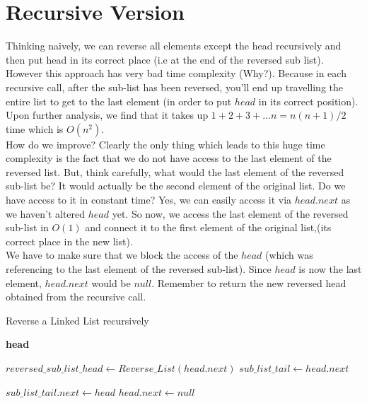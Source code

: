 \documentclass[12pt]{article}
\begin{document}
\section*{Recursive Version}

Thinking naively, we can reverse all elements except the head recursively and then put head in its correct place (i.e at the end of the reversed sub list). However this approach has very bad time complexity (Why?). Because in each recursive call, after the sub-list has been reversed, you'll end up travelling the entire list to get to the last element (in order to put $head$ in its correct position). Upon further analysis, we find that it takes up $1+2+3+...n = n(n+1)/2$ time which is $O(n^2)$.\\

\noindent
How do we improve? Clearly the only thing which leads to this huge time complexity is the fact that we do not have access to the last element of the reversed list. But, think carefully, what would the last element of the reversed sub-list be? It would actually be the second element of the original list. Do we have access to it in constant time? Yes, we can easily access it via $head.next$ as we haven't altered $head$ yet. So now, we access the last element of the reversed sub-list in $O(1)$ and connect it to the first element of the original list,(its correct place in the new list). \\

\noindent
We have to make sure that we block the access of the $head$ (which was referencing to the last element of the reversed sub-list). Since $head$ is now the last element, $head.next$ would be $null$. Remember to return the new reversed head obtained from the recursive call.

\begin{algorithm}

  \caption{Reverse a Linked List recursively}
  
  \begin{algorithmic}[1]
    \Statex
    
        
            \State \Return \textbf{head}
        \EndIf
        
        \State $reversed\_sub\_list\_head \gets Reverse\_List(head.next)$
        \State $sub\_list\_tail \gets head.next$
        
        \State $sub\_list\_tail.next \gets head$
        \State $head.next \gets null$
        
        \State {}
        
    \EndFunction
  \end{algorithmic}
  
\end{algorithm}
\end{document}
